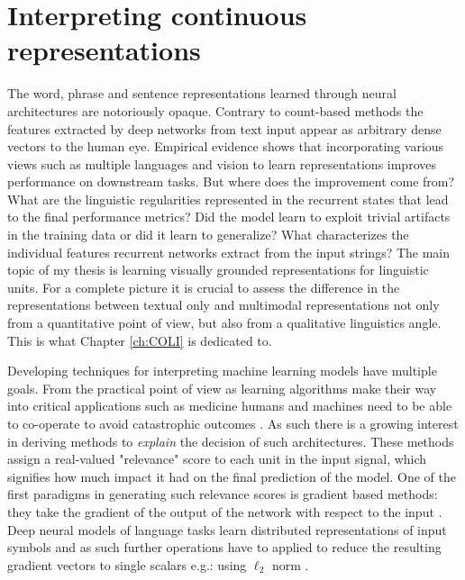 \section{Interpreting continuous representations}
\label{sec:interpret}
The word, phrase and sentence representations learned through neural architectures are notoriously opaque.
Contrary to count-based methods the features extracted by deep networks from text input
appear as arbitrary dense vectors to the human eye.
Empirical evidence shows that incorporating various views such as multiple languages and vision to
learn representations improves performance on downstream tasks.
But where does the improvement come from? What are the linguistic
regularities represented in the recurrent states that lead to the final performance metrics?
Did the model learn to exploit trivial artifacts in the training data or did it learn to generalize?
What characterizes the individual features recurrent networks extract from the input strings?
The main topic of my thesis is learning visually grounded representations for linguistic units.
For a complete picture it is crucial to assess the difference in the representations
between textual only and multimodal representations not only from a quantitative point of view,
but also from a qualitative linguistics angle.
This is what Chapter \ref{ch:COLI} is dedicated to.

Developing techniques for interpreting machine learning models have multiple goals.
From the practical point of view as learning algorithms make their way into critical applications
such as medicine humans and machines need to be able to co-operate to avoid catastrophic
outcomes \citep{caruana2015intelligible}. As such there is a growing interest in deriving methods
to \emph{explain} the decision of such architectures.
These methods assign a real-valued "relevance" score to each unit in the input signal,
which signifies how much impact it had on the final prediction of the model.
One of the first paradigms in generating such relevance scores is gradient based methods:
they take the gradient of the output of the network with respect to the input \cite{simonyan2013deep}.
Deep neural models of language tasks learn distributed representations of input symbols
and as such further operations have to applied to reduce the resulting gradient vectors to
single scalars e.g.: using $\ell_2$ norm \citep{bansal2016ask}.

